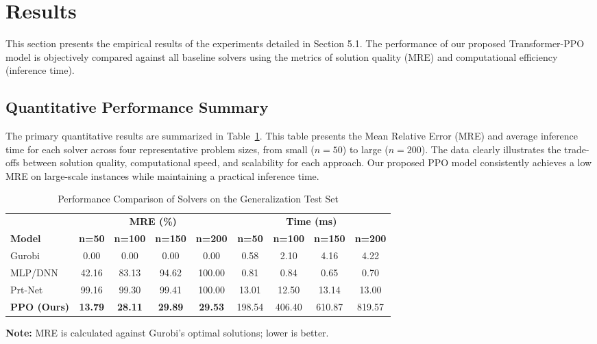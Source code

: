 
\section{Results}
\label{sec:results}

This section presents the empirical results of the experiments detailed in Section 5.1. The performance of our proposed Transformer-PPO model is objectively compared against all baseline solvers using the metrics of solution quality (MRE) and computational efficiency (inference time).

\subsection{Quantitative Performance Summary}
The primary quantitative results are summarized in Table~\ref{tab:main_results}. This table presents the Mean Relative Error (MRE) and average inference time for each solver across four representative problem sizes, from small ($n=50$) to large ($n=200$). The data clearly illustrates the trade-offs between solution quality, computational speed, and scalability for each approach. Our proposed PPO model consistently achieves a low MRE on large-scale instances while maintaining a practical inference time.

\begin{table}[htbp]
    \centering
    \caption{Performance Comparison of Solvers on the Generalization Test Set}
    \label{tab:main_results}
    
    \setlength{\tabcolsep}{4pt} 
    
    \small
    \begin{tabular}{@{}lcccccccc@{}}
        \toprule
        
        & \multicolumn{4}{c}{\textbf{MRE (\%)}} & \multicolumn{4}{c}{\textbf{Time (ms)}} \\
        
        \cmidrule(lr){2-5} \cmidrule(lr){6-9}
        \textbf{Model} & \textbf{n=50} & \textbf{n=100} & \textbf{n=150} & \textbf{n=200} & \textbf{n=50} & \textbf{n=100} & \textbf{n=150} & \textbf{n=200} \\
        \midrule
        Gurobi & 0.00 & 0.00 & 0.00 & 0.00 & 0.58 & 2.10 & 4.16 & 4.22 \\
        MLP/DNN & 42.16 & 83.13 & 94.62 & 100.00 & 0.81 & 0.84 & 0.65 & 0.70 \\
        Prt-Net & 99.16 & 99.30 & 99.41 & 100.00 & 13.01 & 12.50 & 13.14 & 13.00 \\
        \textbf{PPO (Ours)} & \textbf{13.79} & \textbf{28.11} & \textbf{29.89} & \textbf{29.53} & 198.54 & 406.40 & 610.87 & 819.57 \\
        \bottomrule
    \end{tabular}

    \begin{minipage}{0.95\textwidth}
        \small
        \vspace{2pt}
        \textbf{Note:} MRE is calculated against Gurobi's optimal solutions; lower is better.
    \end{minipage}
\end{table}

